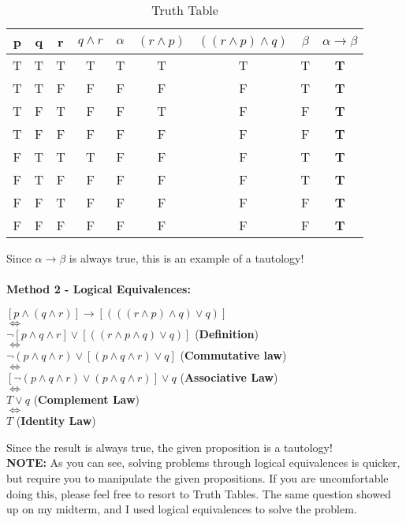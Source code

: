 \begin{table}[ht]
\caption{Truth Table} %
\centering %
\begin{tabular}{c c c c c c c c c } %
\hline\hline %
p & q & r & $q \wedge r$ &  $\alpha$ & $(r \wedge p)$ & $((r \wedge p) \wedge
q)$ & $\beta$ & $\alpha \rightarrow \beta$\\ [0.5ex]
\hline %
T & T & T & T & T & T & T & T & \textbf{T}\\
T & T & F & F & F & F & F & T & \textbf{T}\\
T & F & T & F & F & T & F & F & \textbf{T}\\
T & F & F & F & F & F & F & F & \textbf{T}\\
F & T & T & T & F & F & F & T & \textbf{T}\\
F & T & F & F & F & F & F & T & \textbf{T}\\
F & F & T & F & F & F & F & F & \textbf{T}\\
F & F & F & F & F & F & F & F & \textbf{T}\\[1ex] %
\hline %
\end{tabular}
\label{table:nonlin} %
\end{table}
\noindent Since $\alpha \rightarrow \beta$ is always true, this is an example
of a tautology! \\ \\
\textbf{Method 2 - Logical Equivalences: } \\
\begin{center}
    $[p \wedge (q \wedge r)] \rightarrow [( ( (r \wedge p)\wedge q) \vee q)]$
    \\
    $\Leftrightarrow$ \\
    $ \neg[p \wedge q \wedge r] \vee [(  (r \wedge p\wedge q) \vee q)]$
    (\textbf{Definition}) \\
    $\Leftrightarrow$ \\
    $ \neg (p \wedge q \wedge r) \vee [(p \wedge q \wedge r) \vee q]$
    (\textbf{Commutative law})\\
    $\Leftrightarrow$ \\
    $[\neg (p \wedge q \wedge r) \vee (p \wedge q \wedge r)] \vee q$
    (\textbf{Associative Law}) \\
    $\Leftrightarrow$ \\
    $ T \vee q $ (\textbf{Complement Law}) \\
    $\Leftrightarrow$ \\
    $T$ (\textbf{Identity Law})
\end{center}
\noindent Since the result is always true, the given proposition is a
tautology! \\
\textbf{NOTE:} As you can see, solving problems through logical equivalences is
quicker, but require you to manipulate the given propositions. If you are
uncomfortable doing this, please feel free to resort to Truth Tables. The same
question showed up on my midterm, and I used logical equivalences to solve the
problem.
